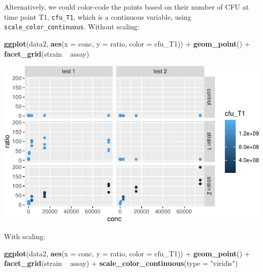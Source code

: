 \documentclass[]{book}
\newenvironment{Shaded}{}{}
\newcommand{\DataTypeTok}[1]{\textcolor[rgb]{0.56,0.13,0.00}{#1}}
\newcommand{\KeywordTok}[1]{\textcolor[rgb]{0.00,0.44,0.13}{\textbf{#1}}}
\newcommand{\NormalTok}[1]{#1}
\newcommand{\OperatorTok}[1]{\textcolor[rgb]{0.40,0.40,0.40}{#1}}
\newcommand{\StringTok}[1]{\textcolor[rgb]{0.25,0.44,0.63}{#1}}
\begin{document}
Alternatively, we could color-code the points based on their number of CFU at time point T1, \texttt{cfu\_T1}, which is a continuous variable, using \texttt{scale\_color\_continuous}. Without scaling:

\begin{Shaded}
\begin{Highlighting}[]
\KeywordTok{ggplot}\NormalTok{(data2, }\KeywordTok{aes}\NormalTok{(}\DataTypeTok{x =}\NormalTok{ conc, }\DataTypeTok{y =}\NormalTok{ ratio, }\DataTypeTok{color =}\NormalTok{ cfu_T1)) }\OperatorTok{+}
\StringTok{  }\KeywordTok{geom_point}\NormalTok{() }\OperatorTok{+}
\StringTok{  }\KeywordTok{facet_grid}\NormalTok{(strain }\OperatorTok{~}\StringTok{ }\NormalTok{assay)}
\end{Highlighting}
\end{Shaded}

\begin{center}\includegraphics[width=\textwidth]{TRES-Tidy-Tutorial_files/figure-latex/unnamed-chunk-140-1} \end{center}

With scaling:

\begin{Shaded}
\begin{Highlighting}[]
\KeywordTok{ggplot}\NormalTok{(data2, }\KeywordTok{aes}\NormalTok{(}\DataTypeTok{x =}\NormalTok{ conc, }\DataTypeTok{y =}\NormalTok{ ratio, }\DataTypeTok{color =}\NormalTok{ cfu_T1)) }\OperatorTok{+}
\StringTok{  }\KeywordTok{geom_point}\NormalTok{() }\OperatorTok{+}
\StringTok{  }\KeywordTok{facet_grid}\NormalTok{(strain }\OperatorTok{~}\StringTok{ }\NormalTok{assay) }\OperatorTok{+}
\StringTok{  }\KeywordTok{scale_color_continuous}\NormalTok{(}\DataTypeTok{type =} \StringTok{"viridis"}\NormalTok{)}
\end{Highlighting}
\end{Shaded}
\end{document}
